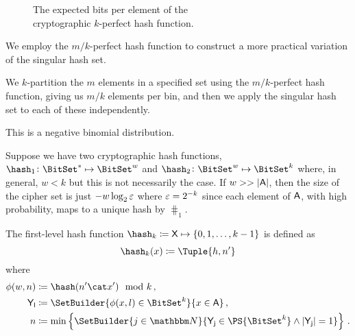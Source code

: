 \documentclass[ ../main.tex]{subfiles}
\begin{document}
\begin{figure}
    \centering
    \caption{The expected bits per element of the\\cryptographic $k$-perfect hash function.}
\end{figure}


We employ the $m/k$-perfect hash function to construct a more practical variation of the singular hash set.

We $k$-partition the $m$ elements in a specified set using the $m/k$-perfect hash function, giving us $m/k$ elements per bin, and then we apply the singular hash set to each of these independently.

This is a negative binomial distribution.


Suppose we have two cryptographic hash functions, $\hash_1 \colon \BitSet^* \mapsto \BitSet^w$ and $\hash_2 \colon \BitSet^w \mapsto \BitSet^k$ where, in general, $w < k$ but this is not necessarily the case.
If $w >> \Card{\Set{A}}$, then the size of the cipher set is just $-w \log_2 \varepsilon$ where $\varepsilon = 2^{-k}$ since each element of $\Set{A}$, with high probability, maps to a unique hash by $\hash_1$.




The first-level hash function $\hash_k \coloneqq \Set{X} \mapsto \{0,1,\ldots,k-1\}$ is defined as
\begin{equation}
    \hash_{k}(x) \coloneqq \Tuple{h,n'}
\end{equation}
where
\begin{equation}
    \begin{split}
        \phi(w,n) 	& \coloneqq \hash(n' \cat x') \mod k\,,\\
        \Set{Y}[l] 	& \coloneqq \SetBuilder{\phi(x,l) \in \BitSet^k}{x \in \Set{A}}\,,\\
        n 			& \coloneqq \min\left\{\SetBuilder{ j \in \NatSet }{ \Set{Y}[j] \in \PS{\BitSet^k} \land \Card{\Set{Y}[j]} = 1}\right\}\,.
    \end{split}
\end{equation}
\end{document}
